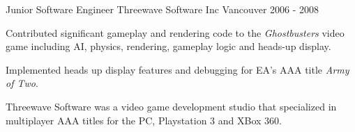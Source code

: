 \begin{cventries}
  \cventrywithsummary
    {Junior Software Engineer} %
    {Threewave Software Inc} %
    {Vancouver} %
    {2006 - 2008} %
    {
      \begin{cvitems} %
        \item {Contributed significant gameplay and rendering code to the \textit{Ghostbusters} video game including AI, physics, rendering, gameplay logic and heads-up display.}
        \item {Implemented heads up display features and debugging for EA's AAA title \textit{Army of Two}.}
      \end{cvitems}
    }
    {
      Threewave Software was a video game development studio that specialized in multiplayer AAA titles for the PC, Playstation 3 and XBox 360.
    }

\end{cventries}

